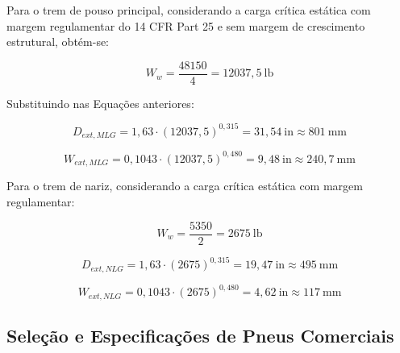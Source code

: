 Para o trem de pouso principal, considerando a carga crítica estática com margem regulamentar do 14 CFR Part 25 e sem margem de crescimento estrutural, obtém-se:

\begin{equation}
W_w = \frac{48150}{4} = 12037,5\ \text{lb}
\end{equation}

Substituindo nas Equações anteriores:

\begin{equation}
D_{ext,MLG} = 1,63 \cdot (12037,5)^{0,315}
= 31,54\ \text{in} \approx 801\ \text{mm}
\end{equation}

\begin{equation}
W_{ext,MLG} = 0,1043 \cdot (12037,5)^{0,480}
= 9,48\ \text{in} \approx 240,7\ \text{mm}
\end{equation}





Para o trem de nariz, considerando a carga crítica estática com margem regulamentar:

\begin{equation}
W_w = \frac{5350}{2} = 2675\ \text{lb}
\end{equation}

\begin{equation}
D_{ext,NLG} = 1,63 \cdot (2675)^{0,315}
= 19,47\ \text{in} \approx 495\ \text{mm}
\end{equation}

\begin{equation}
W_{ext,NLG} = 0,1043 \cdot (2675)^{0,480}
= 4,62\ \text{in} \approx 117\ \text{mm}
\end{equation}


\subsection{Seleção e Especificações de Pneus Comerciais}

